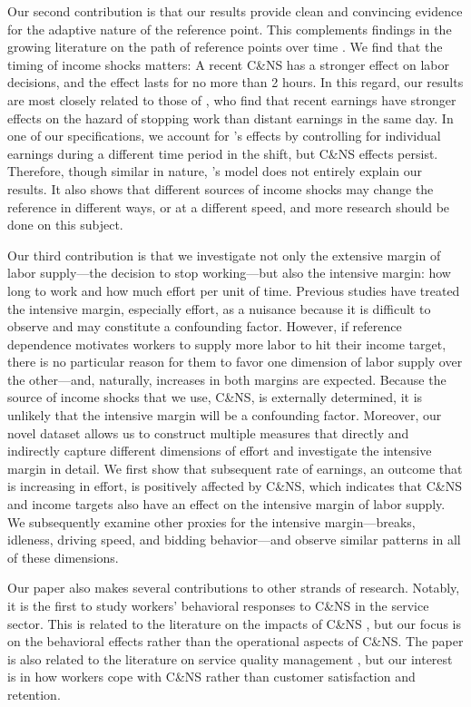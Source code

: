 \documentclass[reviewmode,AEJ]{AEA}
\begin{document}
Our second contribution is that our results provide clean and convincing evidence for the adaptive nature
of the reference point. This complements findings in the growing literature on the path of reference points
over time \citep{dellavigna2017reference,thakral2018daily}. We find that the timing of income shocks matters:
A recent C\&NS has a stronger effect on labor decisions, and the effect lasts for no more than 2 hours. 
In this regard, our results are most closely related to those of \citet{thakral2018daily}, who find that 
recent earnings have stronger effects on the hazard of stopping work than distant earnings in the same day.
In one of our specifications, we account for \citeauthor{thakral2018daily}'s effects by controlling for
individual earnings during a different time period in the shift, but C\&NS effects persist. Therefore,
though similar in nature, \citeauthor{thakral2018daily}'s model does not entirely explain our results. 
It also shows that different sources of income shocks may change the reference in different ways, or at
a different speed, and more research should be done on this subject.

Our third contribution is that we investigate not only the extensive margin of labor supply---the decision
to stop working---but also the intensive margin: how long to work and how much effort per unit of time. 
Previous studies have treated the intensive margin, especially effort, as a nuisance because it is 
difficult to observe and may constitute a confounding factor. However, if reference dependence motivates
workers to supply more labor to hit their income target, there is no particular reason for them to favor
one dimension of labor supply over the other---and, naturally, increases in both margins are expected.
Because the source of income shocks that we use, C\&NS, is externally determined, it is unlikely that the 
intensive margin will be a confounding factor. Moreover, our novel dataset allows us to construct multiple
measures that directly and indirectly capture different dimensions of effort and investigate the intensive
margin in detail. We first show that subsequent rate of earnings, an outcome that is increasing in effort,
is positively affected by C\&NS, which indicates that C\&NS and income targets also have an effect on the
intensive margin of labor supply. We subsequently examine other proxies for the intensive margin---breaks,
idleness, driving speed, and bidding behavior---and observe similar patterns in all of these dimensions.

Our paper also makes several contributions to other strands of research. Notably, it is the first to study
workers' behavioral responses to C\&NS in the service sector. This is related to the literature on the
impacts of C\&NS \citep{moore2001time,patrick2008reducing,norris2014empirical,feldman2014appointment}, 
but our focus is on the behavioral effects rather than the operational aspects of C\&NS. 
The paper is also related to the literature on service quality management \citep{cohen2018frustration},
but our interest is in how workers cope with C\&NS rather than customer satisfaction and retention. 
\end{document}
